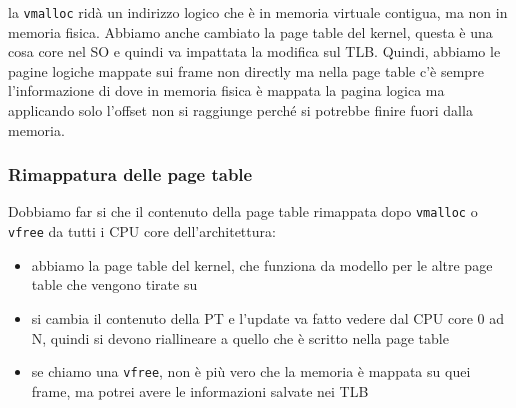 \documentclass[12pt, oneside]{extbook}
\begin{document}
la \texttt{vmalloc} ridà un indirizzo logico che è in memoria virtuale contigua, ma non in memoria fisica. Abbiamo anche cambiato la page table del kernel, questa è una cosa core nel SO e quindi va impattata la modifica sul TLB. Quindi, abbiamo le pagine logiche mappate sui frame non directly ma nella page table c'è sempre l'informazione di dove in memoria fisica è mappata la pagina logica ma applicando solo l'offset non si raggiunge perché si potrebbe finire fuori dalla memoria.
\subsubsection{Rimappatura delle page table}
Dobbiamo far si che il contenuto della page table rimappata dopo \texttt{vmalloc} o \texttt{vfree} da tutti i CPU core dell'architettura:
\begin{itemize}
\item abbiamo la page table del kernel, che funziona da modello per le altre page table che vengono tirate su
\item si cambia il contenuto della PT e l'update va fatto vedere dal CPU core 0 ad N, quindi si devono riallineare a quello che è scritto nella page table
\item se chiamo una \texttt{vfree}, non è più vero che la memoria è mappata su quei frame, ma potrei avere le informazioni salvate nei TLB
\end{itemize}
\end{document}
